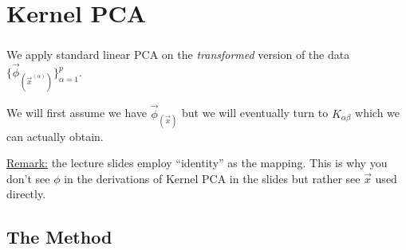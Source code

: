 \section{Kernel PCA}


\begin{frame}\frametitle{\secname}

We apply standard linear PCA on the \emph{transformed} version of the data
$
\big\{
\vec{\phi}_{(\vec{x}^{(\alpha)})}
\big\}_{\alpha=1}^{p}
$.

We will first assume we have $\vec{\phi}_{(\vec{x})}$ 
but we will eventually turn to $K_{\alpha \beta}$ 
which we can actually obtain.\\

\pause

\svspace{10mm}

\underline{Remark:}
the lecture slides employ ``identity'' as the mapping. 
This is why you don't see $\phi$ in the derivations of Kernel PCA in the slides but rather see $\vec x$ used directly.\\

\end{frame}

\subsection{The Method}


